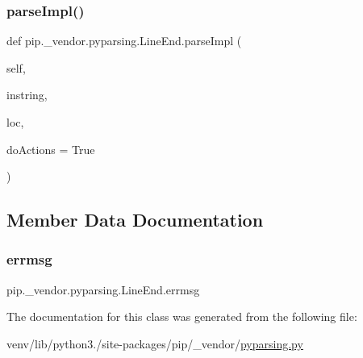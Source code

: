 \subsubsection{\texorpdfstring{parse\+Impl()}{parseImpl()}}
{\footnotesize\ttfamily def pip.\+\_\+vendor.\+pyparsing.\+Line\+End.\+parse\+Impl (\begin{DoxyParamCaption}\item[{}]{self,  }\item[{}]{instring,  }\item[{}]{loc,  }\item[{}]{do\+Actions = {\ttfamily True} }\end{DoxyParamCaption})}



\subsection{Member Data Documentation}
\mbox{\label{classpip_1_1__vendor_1_1pyparsing_1_1LineEnd_a066723867323c4f42e1bdcf2ccd0ca96}} 
\subsubsection{\texorpdfstring{errmsg}{errmsg}}
{\footnotesize\ttfamily pip.\+\_\+vendor.\+pyparsing.\+Line\+End.\+errmsg}



The documentation for this class was generated from the following file\+:\begin{DoxyCompactItemize}
\item 
venv/lib/python3./site-\/packages/pip/\+\_\+vendor/\hyperlink{pip_2__vendor_2pyparsing_8py}{pyparsing.\+py}\end{DoxyCompactItemize}
